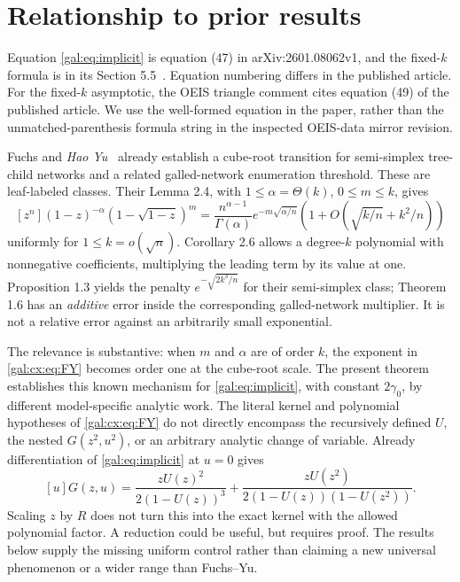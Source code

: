 \documentclass[11pt,letterpaper]{article}
\numberwithin{equation}{section}
\theoremstyle{definition}\newtheorem{definition}[theorem]{Definition}
\theoremstyle{remark}\newtheorem{remark}[theorem]{Remark}
\begin{document}
\section{Relationship to prior results}
Equation \eqref{gal:eq:implicit} is equation (47) in arXiv:2601.08062v1, and the fixed-$k$ formula is in its Section 5.5~\cite{comparison}. Equation numbering differs in the published article. For the fixed-$k$ asymptotic, the OEIS triangle comment cites equation (49) of the published article. We use the well-formed equation in the paper, rather than the unmatched-parenthesis formula string in the inspected OEIS-data mirror revision.

Fuchs and \emph{Hao Yu}~\cite{fuchs-yu} already establish a cube-root transition for semi-simplex tree-child networks and a related galled-network enumeration threshold. These are leaf-labeled classes. Their Lemma 2.4, with $1\le\alpha=\Theta(k)$, $0\le m\le k$, gives
\begin{equation}\label{gal:cx:eq:FY}
[z^n](1-z)^{-\alpha}(1-\sqrt{1-z})^m
=\frac{n^{\alpha-1}}{\Gamma(\alpha)}e^{-m\sqrt{\alpha/n}}
\left(1+O\!\left(\sqrt{k/n}+k^2/n\right)\right)
\end{equation}
uniformly for $1\le k=o(\sqrt n)$. Corollary 2.6 allows a degree-$k$ polynomial with nonnegative coefficients, multiplying the leading term by its value at one. Proposition 1.3 yields the penalty $e^{-\sqrt{2k^3/n}}$ for their semi-simplex class; Theorem 1.6 has an \emph{additive} error inside the corresponding galled-network multiplier. It is not a relative error against an arbitrarily small exponential.

The relevance is substantive: when $m$ and $\alpha$ are of order $k$, the exponent in \eqref{gal:cx:eq:FY} becomes order one at the cube-root scale. The present theorem establishes this known mechanism for \eqref{gal:eq:implicit}, with constant $2\gamma_0$, by different model-specific analytic work. The literal kernel and polynomial hypotheses of \eqref{gal:cx:eq:FY} do not directly encompass the recursively defined $U$, the nested $G(z^2,u^2)$, or an arbitrary analytic change of variable. Already differentiation of \eqref{gal:eq:implicit} at $u=0$ gives
\begin{equation}\label{gal:cx:eq:onegall}
[u]G(z,u)=\frac{zU(z)^2}{2(1-U(z))^3}
+\frac{zU(z^2)}{2(1-U(z))(1-U(z^2))}.
\end{equation}
Scaling $z$ by $R$ does not turn this into the exact kernel with the allowed polynomial factor. A reduction could be useful, but requires proof. The results below supply the missing uniform control rather than claiming a new universal phenomenon or a wider range than Fuchs--Yu.
\end{document}
